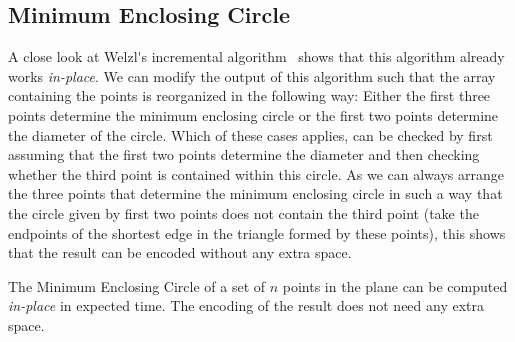 \subsection{Minimum Enclosing Circle}

A close look at Welzl\'{}s incremental
algorithm~\cite{welzl:smallest} shows that this algorithm already
works \emph{in-place}. We can modify the output of this algorithm such
that the array containing the points is reorganized in the following
way: Either the first three points determine the minimum enclosing
circle or the first two points determine the diameter of the circle.
Which of these cases applies, can be checked by first assuming that
the first two points determine the diameter and then checking whether
the third point is contained within this circle. As we can always
arrange the three points that determine the minimum enclosing circle
in such a way that the circle given by first two points does not
contain the third point (take the endpoints of the shortest edge in
the triangle formed by these points), this shows that the result
can be encoded without any extra space.

\begin{lemma}
  The Minimum Enclosing Circle of a set of $n$ points in the plane can
  be computed \emph{in-place} in  expected time. The encoding of
  the result does not need any extra space.
\end{lemma}

